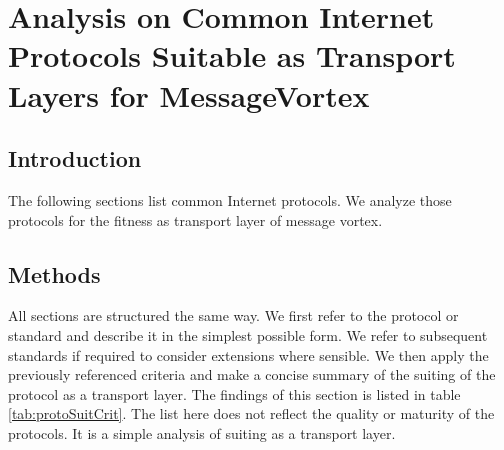 \documentclass[a4paper,appendixprefix,pdfusetitle,twocolumn,fontsize=8pt,DIV=calc,8pt,draft]{\doctype} %
\begin{document}
\mainmatter







\onecolumn
\appendix
{}%
\renewcommand*{\thepage}{A\arabic{page}}



\gdef\rfc{../../../../rfc/src/xml2rfc/draft-gwerder-messagevortexmain-04.pdf}
%



\twocolumn\clearpage
\chapter{Analysis on Common Internet Protocols Suitable as Transport Layers for MessageVortex\label{app:transportProtocols}}

\section{Introduction}
The following sections list common Internet protocols. We analyze those protocols for the fitness as transport layer of message vortex. 

\section{Methods}

All sections are structured the same way. We first refer to the protocol or standard and describe it in the simplest possible form. We refer to subsequent standards if required to consider extensions where sensible. We then apply the previously referenced criteria and make a concise summary of the suiting of the protocol as a transport layer. The findings of this section is listed in table \ref{tab:protoSuitCrit}. The list here does not reflect the quality or maturity of the protocols. It is a simple analysis of suiting as a transport layer.
\end{document}
